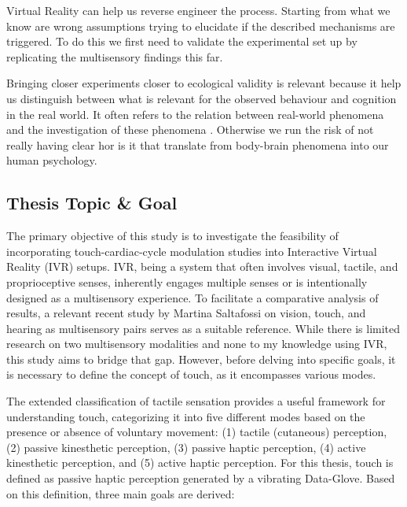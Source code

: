 \documentclass[12pt,oneside,openright]{report}
\begin{document}
Virtual Reality can help us reverse engineer the process. Starting from what we know are wrong assumptions trying to elucidate if the described mechanisms are triggered. To do this we first need to validate the experimental set up by replicating the multisensory findings this far.

Bringing closer experiments closer to ecological validity is relevant because it help us distinguish between what is relevant for the observed behaviour and cognition in the real world.  It often refers to the relation between real-world phenomena and the investigation of these phenomena \parencite{schmuckler2001ecological}. Otherwise we run the risk of not really having clear hor is it that translate from body-brain phenomena into our human psychology.

\subsection*{Thesis Topic \& Goal}

The primary objective of this study is to investigate the feasibility of incorporating touch-cardiac-cycle modulation studies into Interactive Virtual Reality (IVR) setups. IVR, being a system that often involves visual, tactile, and proprioceptive senses, inherently engages multiple senses or is intentionally designed as a multisensory experience. To facilitate a comparative analysis of results, a relevant recent study by Martina Saltafossi on vision, touch, and hearing as multisensory pairs \cite{SALTAFOSSI2023108642} serves as a suitable reference. While there is limited research on two multisensory modalities and none to my knowledge using IVR, this study aims to bridge that gap. However, before delving into specific goals, it is necessary to define the concept of touch, as it encompasses various modes.

The extended classification of tactile sensation \cite{Healy2003HandbookOP} provides a useful framework for understanding touch, categorizing it into five different modes based on the presence or absence of voluntary movement: (1) tactile (cutaneous) perception, (2) passive kinesthetic perception, (3) passive haptic perception, (4) active kinesthetic perception, and (5) active haptic perception. For this thesis, touch is defined as passive haptic perception generated by a vibrating Data-Glove. Based on this definition, three main goals are derived:
\end{document}
